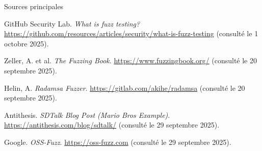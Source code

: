 \documentclass[10pt]{beamer}
\begin{document}
\begin{frame}{Sources principales}
\footnotesize
\begin{thebibliography}{9}

GitHub Security Lab. 
\newblock \emph{What is fuzz testing?}  
\newblock  \url{https://github.com/resources/articles/security/what-is-fuzz-testing} (consulté le 1 octobre 2025).

Zeller, A. et al.  
\newblock \emph{The Fuzzing Book}.  
\newblock \url{https://www.fuzzingbook.org/} (consulté le 20 septembre 2025).

Helin, A.  
\newblock \emph{Radamsa Fuzzer}.  
\newblock \url{https://gitlab.com/akihe/radamsa} (consulté le 20 septembre 2025).

Antithesis.  
\newblock \emph{SDTalk Blog Post (Mario Bros Example)}.  
\newblock \url{https://antithesis.com/blog/sdtalk/} (consulté le 29 septembre 2025).

Google.  
\newblock \emph{OSS-Fuzz}.  
\newblock  \url{https://oss-fuzz.com} (consulté le 29 septembre 2025).

\end{thebibliography}
\end{frame}
\end{document}
